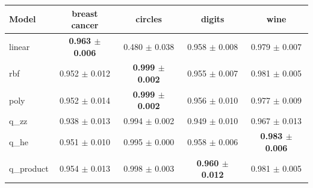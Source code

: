 \begin{tabular}{lcccc}
\toprule
Model & breast cancer & circles & digits & wine \\
\midrule
linear & \textbf{0.963 $\pm$ 0.006} & 0.480 $\pm$ 0.038 & 0.958 $\pm$ 0.008 & 0.979 $\pm$ 0.007 \\
rbf & 0.952 $\pm$ 0.012 & \textbf{0.999 $\pm$ 0.002} & 0.955 $\pm$ 0.007 & 0.981 $\pm$ 0.005 \\
poly & 0.952 $\pm$ 0.014 & \textbf{0.999 $\pm$ 0.002} & 0.956 $\pm$ 0.010 & 0.977 $\pm$ 0.009 \\
\midrule
q\_zz & 0.938 $\pm$ 0.013 & 0.994 $\pm$ 0.002 & 0.949 $\pm$ 0.010 & 0.967 $\pm$ 0.013 \\
q\_he & 0.951 $\pm$ 0.010 & 0.995 $\pm$ 0.000 & 0.958 $\pm$ 0.006 & \textbf{0.983 $\pm$ 0.006} \\
q\_product & 0.954 $\pm$ 0.013 & 0.998 $\pm$ 0.003 & \textbf{0.960 $\pm$ 0.012} & 0.981 $\pm$ 0.005 \\
\bottomrule
\end{tabular}
